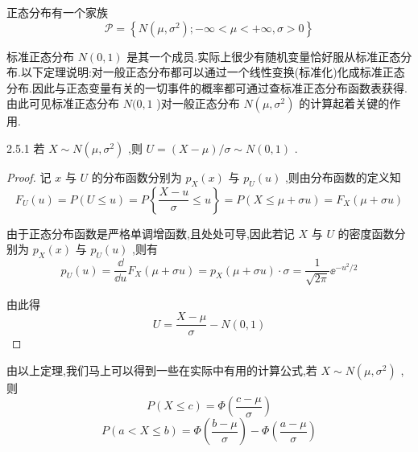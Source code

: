正态分布有一个家族
\[
\mathscr{P}=\left\{N\left(\mu, \sigma^{2}\right) ;-\infty<\mu<+\infty, \sigma>0\right\}
\]

标准正态分布 $ N(0,1) $ 是其一个成员.实际上很少有随机变量恰好服从标准正态分布.以下定理说明:对一般正态分布都可以通过一个线性变换(标准化)化成标准正态分布.因此与正态变量有关的一切事件的概率都可通过查标准正态分布函数表获得.由此可见标准正态分布 $ N(0,1 $ )对一般正态分布 $ N\left(\mu, \sigma^{2}\right) $ 的计算起着关键的作用.
\begin{theorem}{}{2.5.1}
	若 $ X \sim N\left(\mu, \sigma^{2}\right) $ ,则 $ U=(X-\mu) / \sigma \sim N(0,1) $ .
\end{theorem}

\begin{proof}
	记 $ x $ 与 $ U $ 的分布函数分别为 $ p_{X}(x) $ 与 $ p_{U}(u) $ ,则由分布函数的定义知
	\[
	F_{U}(u)=P(U \leqslant u)=P\left\{\frac{X-u}{\sigma} \leqslant u\right\}=P(X \leqslant \mu+\sigma u)=F_{X}(\mu+\sigma u)
	\]
	
	由于正态分布函数是严格单调增函数,且处处可导,因此若记 $ X $ 与 $ U $ 的密度函数分别为 $ p_{X}(x) $ 与 $ p_{U}(u) $ ,则有
	\[
	p_{U}(u)=\frac{\dd}{\dd u} F_{X}(\mu+\sigma u)=p_{X}(\mu+\sigma u) \cdot \sigma=\frac{1}{\sqrt{2 \pi}} \ee ^{-u^{2} / 2}
	\]
	
	由此得
	\[
	U=\frac{X-\mu}{\sigma}-N(0,1)
	\]
\end{proof}


由以上定理,我们马上可以得到一些在实际中有用的计算公式,若 $ X \sim N\left(\mu, \sigma^{2}\right) $ ,则
\begin{equation}
P(X \leqslant c)=\Phi\left(\frac{c-\mu}{\sigma}\right) \label{eq:2.5.3}
\end{equation}
\begin{equation}
P(a<X \leqslant b)=\Phi\left(\frac{b-\mu}{\sigma}\right)-\Phi\left(\frac{a-\mu}{\sigma}\right) \label{eq:2.5.4}
\end{equation}

